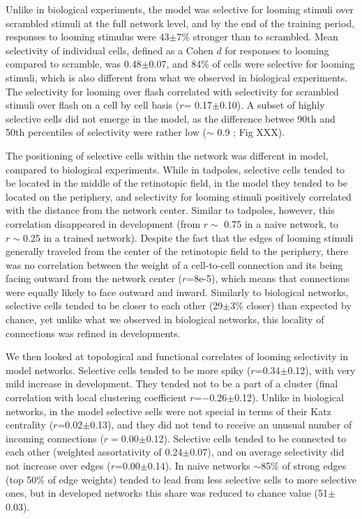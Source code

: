 \documentclass{article}
\begin{document}
Unlike in biological experiments, the model was selective for looming stimuli over scrambled stimuli at the full network level, and by the end of the training period, responses to looming stimulus were 43$\pm$7\% stronger than to scrambled. Mean selectivity of individual cells, defined as a Cohen $d$ for responses to looming compared to scramble, was 0.48$\pm$0.07, and 84\% of cells were selective for looming stimuli, which is also different from what we observed in biological experiments. The selectivity for looming over flash correlated with selectivity for scrambled stimuli over flash on a cell by cell basis ($r$= 0.17$\pm$0.10). A subset of highly selective cells did not emerge in the model, as the difference betwee 90th and 50th percentiles of selectivity were rather low ($\sim$ 0.9 ; Fig XXX).

The positioning of selective cells within the network was different in model, compared to biological experiments. While in tadpoles, selective cells tended to be located in the middle of the retinotopic field, in the model they tended to be located on the periphery, and selectivity for looming stimuli positively correlated with the distance from the network center. Similar to tadpoles, however, this correlation disappeared in development (from $r\sim$ 0.75 in a naive network, to $r\sim$0.25 in a trained network). Despite the fact that the edges of looming stimuli generally traveled from the center of the retinotopic field to the periphery, there was no correlation between the weight of a cell-to-cell connection and its being facing outward from the network center ($r$=8e-5), which means that connections were equally likely to face outward and inward. Similarly to biological networks, selective cells tended to be closer to each other (29$\pm$3\% closer) than expected by chance, yet unlike what we observed in biological networks, this locality of connections was refined in developments.

We then looked at topological and functional correlates of looming selectivity in model networks. Selective cells tended to be more spiky ($r$=0.34$\pm$0.12), with very mild increase in development. They tended not to be a part of a cluster (final correlation with local clustering coefficient $r$=$-$0.26$\pm$0.12). Unlike in biological networks, in the model selective sells were not special in terms of their Katz centrality ($r$=0.02$\pm$0.13), and they did not tend to receive an unusual number of incoming connections ($r=$0.00$\pm$0.12). Selective cells tended to be connected to each other (weighted assortativity of 0.24$\pm$0.07), and on average selectivity did not increase over edges ($r$=0.00$\pm$0.14). In naive networks $\sim$85\% of strong edges (top 50\% of edge weights) tended to lead from less selective sells to more selective ones, but in developed networks this share was reduced to chance value (51$\pm$0.03).
\end{document}
